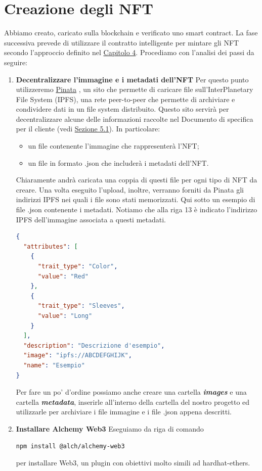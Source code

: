 \documentclass[12pt]{report}
\begin{document}
\section{Creazione degli NFT}
Abbiamo creato, caricato sulla blockchain e verificato uno smart contract. La fase successiva prevede di utilizzare il contratto intelligente per mintare gli NFT secondo l'approccio definito nel \hyperref[chap:capitolo4]{Capitolo 4}. Procediamo con l'analisi dei passi da seguire:
\begin{enumerate}[topsep=5pt, itemsep=0pt]

\item \textbf{Decentralizzare l'immagine e i metadati dell'NFT}\newline
Per questo punto utilizzeremo \href{https://www.pinata.cloud/}{Pinata} \cite{Ventuno}, un sito che permette di caricare file sull'InterPlanetary File System (IPFS), una rete peer-to-peer che permette di archiviare e condividere dati in un file system distribuito. Questo sito servirà per decentralizzare alcune delle informazioni raccolte nel Documento di specifica per il cliente (vedi \hyperref[sec:documento]{Sezione 5.1}). In particolare:
\begin{itemize}[topsep=-3pt, itemsep=0pt]
    \item un file contenente l'immagine che rappresenterà l'NFT;
    \item un file in formato .json che includerà i metadati dell'NFT.
\end{itemize}
Chiaramente andrà caricata una coppia di questi file per ogni tipo di NFT da creare. Una volta eseguito l'upload, inoltre, verranno forniti da Pinata gli indirizzi IPFS nei quali i file sono stati memorizzati.\newline
Qui sotto un esempio di file .json contenente i metadati. Notiamo che alla riga 13 è indicato l'indirizzo IPFS dell'immagine associata a questi metadati.
\begin{lstlisting}[language=JSON, aboveskip=2pt, belowskip=-3pt]
{
  "attributes": [
    {
      "trait_type": "Color",
      "value": "Red"
    },
    {
      "trait_type": "Sleeves",
      "value": "Long"
    }
  ],
  "description": "Descrizione d'esempio",
  "image": "ipfs://ABCDEFGHIJK",
  "name": "Esempio"
}
\end{lstlisting}
Per fare un po' d'ordine possiamo anche creare una cartella \textit{\textbf{images}} e una cartella \textit{\textbf{metadata}}, inserirle all'interno della cartella del nostro progetto ed utilizzarle per archiviare i file immagine e i file .json appena descritti.
\item \textbf{Installare Alchemy Web3}\newline
Eseguiamo da riga di comando
\begin{lstlisting}[language=HTML, numbers=none, aboveskip=2pt, belowskip=-3pt]
npm install @alch/alchemy-web3
\end{lstlisting}
per installare Web3, un plugin con obiettivi molto simili ad hardhat-ethers.


\end{enumerate}
\end{document}
